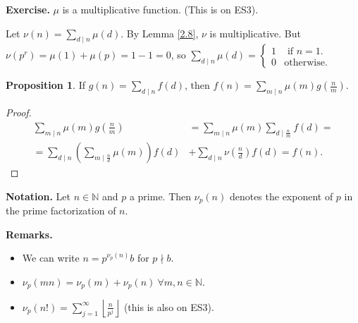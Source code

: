 \documentclass{article}
\theoremstyle{definition}
\newtheorem{prop}[theorem]{Proposition}
\begin{document}
\textbf{Exercise.} $\mu$ is a multiplicative function. (This is on ES3).
\vspace{1mm}

Let $\nu(n) = \sum_{d \mid n}^{} \mu(d)$. By Lemma \ref{2.8}, $\nu$ is multiplicative. But $\nu(p^r) = \mu(1)+\mu(p)= 1 - 1 = 0$, so $\sum_{d \mid n}^{} \mu(d) = \begin{cases}
    1 &\text{ if } n=1. \\
    0 &\text{otherwise.}
\end{cases}$
\begin{prop}
    If $g(n)=\sum_{d \mid n}^{} f(d)$, then $f(n)=\sum_{m \mid n}^{} \mu(m)g \left(\frac{n}{m}\right)$.
\end{prop}
\begin{proof}
    \begin{align*}
        \sum_{m \mid n}^{} \mu(m)g\left(\frac{n}{m}\right) &= \sum_{m \mid n}^{} \mu(m) \sum_{d \mid \frac{n}{m}}^{} f(d) = \\ 
        =\sum_{d \mid n}^{} \left( \sum_{m \mid \frac{n}{d}}^{} \mu(m)\right)f(d) &+ \sum_{d \mid n}^{} \nu\left(\frac{n}{d} \right)f(d) = f(n).
    \end{align*}
\end{proof}


\textbf{Notation.} Let $n \in \mathbb{N}$ and $p$ a prime. Then $\nu_p(n)$ denotes the exponent of $p$ in the prime factorization of $n$.

\textbf{Remarks.}
\begin{itemize}
    \item We can write $n=p^{\nu_p(n)}b$ for $p \nmid b$.
    \item $\nu_p(mn)=\nu_p(m)+\nu_p(n) ~\forall m,n \in \mathbb{N}$.
    \item $\nu_p(n!)=\sum_{j=1}^{\infty} \left\lfloor \frac{n}{p^j} \right\rfloor$ (this is also on ES3).
\end{itemize} 
\end{document}
